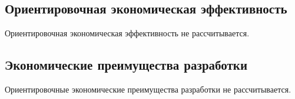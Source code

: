 \subsection{Ориентировочная экономическая эффективность}
Ориентировочная экономическая эффективность не рассчитывается.

\subsection{Экономические преимущества разработки}
Ориентировочные экономические преимущества разработки не рассчитывается.